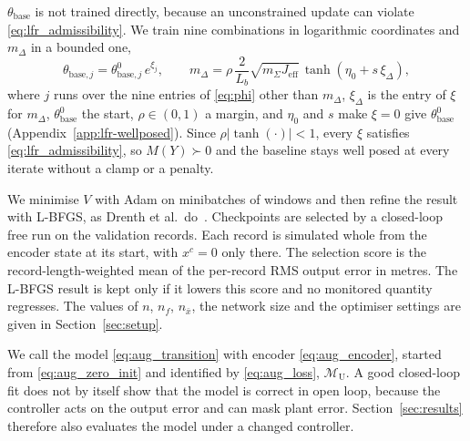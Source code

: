 $\theta_{\mathrm{base}}$ is not trained directly, because an unconstrained
update can violate \eqref{eq:lfr_admissibility}.
We train nine combinations in logarithmic coordinates and $m_\Delta$ in a
bounded one,
\begin{equation}
 \theta_{\mathrm{base},j}=\theta^0_{\mathrm{base},j}\,e^{\xi_j},\qquad
 m_\Delta=\rho\,\frac{2}{L_b}\sqrt{m_\Sigma J_{\mathrm{eff}}}\,\tanh(\eta_0+s\,\xi_\Delta),
 \label{eq:mdelta_map}
\end{equation}
where $j$ runs over the nine entries of \eqref{eq:phi} other than $m_\Delta$,
$\xi_\Delta$ is the entry of $\xi$ for $m_\Delta$, $\theta^0_{\mathrm{base}}$
the start, $\rho\in(0,1)$ a margin, and $\eta_0$ and $s$ make $\xi=0$ give
$\theta^0_{\mathrm{base}}$ (Appendix~\ref{app:lfr-wellposed}).
Since $\rho\lvert\tanh(\cdot)\rvert<1$, every $\xi$ satisfies
\eqref{eq:lfr_admissibility}, so $M(Y)\succ0$ and the baseline stays well
posed at every iterate without a clamp or a penalty.

We minimise $V$ with Adam on minibatches of windows and then refine the
result with L-BFGS, as Drenth et al.\ do~\cite[Sec.~5]{drenth2025lpvlfr}.
Checkpoints are selected by a closed-loop free run on the validation records.
Each record is simulated whole from the encoder state at its start, with
$x^{c}=0$ only there.
The selection score is the record-length-weighted mean of the per-record RMS
output error in metres.
The L-BFGS result is kept only if it lowers this score and no monitored
quantity regresses.
The values of $n$, $n_f$, $n_{\bar x}$, the network size and the optimiser
settings are given in Section~\ref{sec:setup}.

We call the model \eqref{eq:aug_transition} with encoder
\eqref{eq:aug_encoder}, started from \eqref{eq:aug_zero_init} and identified
by \eqref{eq:aug_loss}, $\mathcal M_{\mathrm U}$.
A good closed-loop fit does not by itself show that the model is correct in
open loop, because the controller acts on the output error and can mask plant
error.
Section~\ref{sec:results} therefore also evaluates the model under a changed
controller.

